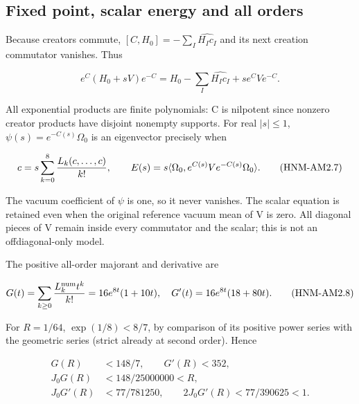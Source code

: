 \hypertarget{r29-am2-fixed-point-scalar-energy-and-all-orders}{%
\subsection{Fixed point, scalar energy and all orders}\label{r29:am2:r29-am2-fixed-point-scalar-energy-and-all-orders}}

Because creators commute, \([C,H_0]=-\sum_I\widehat{H_Ic_I}\) and its next creation commutator vanishes. Thus

\begin{equation}
e^C(H_0+sV)e^{-C}=H_0-\sum_I\widehat{H_Ic_I}+s e^CVe^{-C}.
\tag{HNM-AM2.6}
\label{r29:am2:eq6}
\end{equation}

All exponential products are finite polynomials: C is nilpotent since nonzero creator products have disjoint nonempty supports. For real \(|s|\le 1\), \(\psi(s)=e^{-C(s)}\Omega_0\) is an eigenvector precisely when

\begin{equation}
c=s\sum_{k=0}^{8}{L_k(c,\ldots,c)\over k!},\qquad
E(s)=s\langle\Omega_0,e^{C(s)}Ve^{-C(s)}\Omega_0\rangle .
\tag{HNM-AM2.7}
\label{r29:am2:eq7}
\end{equation}

The vacuum coefficient of \(\psi\) is one, so it never vanishes. The scalar equation is retained even when the original reference vacuum mean of V is zero. All diagonal pieces of V remain inside every commutator and the scalar; this is not an offdiagonal-only model.

The positive all-order majorant and derivative are

\begin{equation}
G(t)=\sum_{k\ge0}{L_k^{\rm num}t^k\over k!}
=16e^{8t}(1+10t),\quad
G'(t)=16e^{8t}(18+80t).
\tag{HNM-AM2.8}
\label{r29:am2:eq8}
\end{equation}

For \(R=1/64\), \(\exp(1/8)<8/7\), by comparison of its positive power series with the geometric series (strict already at second order). Hence

\begin{equation}
\begin{aligned}G(R)&<148/7,\qquad G'(R)<352,\\ J_0G(R)&<148/25000000<R,\\ J_0G'(R)&<77/781250,\qquad 2J_0G'(R)<77/390625<1.\end{aligned}\tag{HNM-AM2.9}
\label{r29:am2:eq9}
\end{equation}

